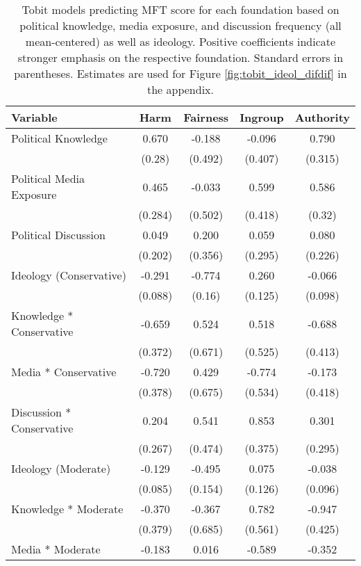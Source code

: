 \begin{table}[ht]
\centering
\caption{Tobit models predicting MFT score for each foundation based 
           on political knowledge, media exposure, and discussion frequency (all mean-centered)
           as well as ideology. Positive coefficients indicate stronger emphasis on the respective
           foundation. Standard errors in parentheses. Estimates are used for Figure
           \ref{fig:tobit_ideol_difdif} in the appendix.} 
\label{tab:tobit_ideol_difdif}
\begingroup\footnotesize
\begin{tabular}{lcccc}
  \hline
Variable & Harm & Fairness & Ingroup & Authority \\ 
  \hline
Political Knowledge &  0.670 & -0.188 & -0.096 &  0.790 \\ 
   & (0.28) & (0.492) & (0.407) & (0.315) \\ 
  Political Media Exposure &  0.465 & -0.033 &  0.599 &  0.586 \\ 
   & (0.284) & (0.502) & (0.418) & (0.32) \\ 
  Political Discussion &  0.049 &  0.200 &  0.059 &  0.080 \\ 
   & (0.202) & (0.356) & (0.295) & (0.226) \\ 
  Ideology (Conservative) & -0.291 & -0.774 &  0.260 & -0.066 \\ 
   & (0.088) & (0.16) & (0.125) & (0.098) \\ 
  Knowledge * Conservative & -0.659 &  0.524 &  0.518 & -0.688 \\ 
   & (0.372) & (0.671) & (0.525) & (0.413) \\ 
  Media * Conservative & -0.720 &  0.429 & -0.774 & -0.173 \\ 
   & (0.378) & (0.675) & (0.534) & (0.418) \\ 
  Discussion * Conservative &  0.204 &  0.541 &  0.853 &  0.301 \\ 
   & (0.267) & (0.474) & (0.375) & (0.295) \\ 
  Ideology (Moderate) & -0.129 & -0.495 &  0.075 & -0.038 \\ 
   & (0.085) & (0.154) & (0.126) & (0.096) \\ 
  Knowledge * Moderate & -0.370 & -0.367 &  0.782 & -0.947 \\ 
   & (0.379) & (0.685) & (0.561) & (0.425) \\ 
  Media * Moderate & -0.183 &  0.016 & -0.589 & -0.352 \\ 

\end{tabular}
\end{table}
